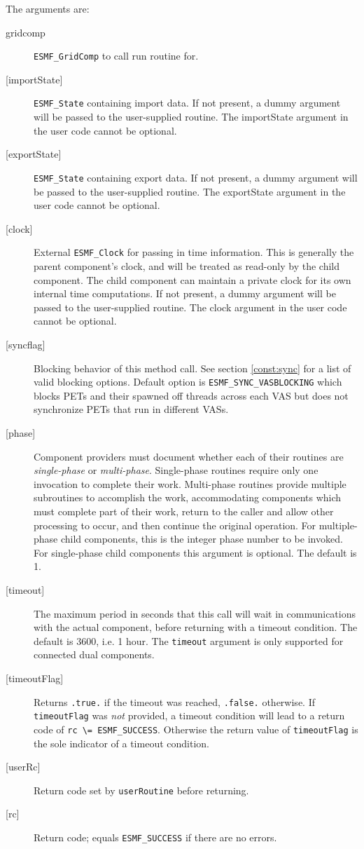    The arguments are:
   \begin{description}
   \item[gridcomp]
     {\tt ESMF\_GridComp} to call run routine for.
   \item[{[importState]}]
     {\tt ESMF\_State} containing import data. If not present, a dummy
     argument will be passed to the user-supplied routine.  The
     importState argument in the user code cannot be optional.
   \item[{[exportState]}]
     {\tt ESMF\_State} containing export data. If not present, a dummy
     argument will be passed to the user-supplied routine.  The
     exportState argument in the user code cannot be optional.
   \item[{[clock]}]
     External {\tt ESMF\_Clock} for passing in time information.
     This is generally the parent component's clock, and will be treated
     as read-only by the child component.  The child component can maintain
     a private clock for its own internal time computations. If not present, a dummy
     argument will be passed to the user-supplied routine.  The
     clock argument in the user code cannot be optional.
   \item[{[syncflag]}]
     Blocking behavior of this method call. See section \ref{const:sync}
     for a list of valid blocking options. Default option is
     {\tt ESMF\_SYNC\_VASBLOCKING} which blocks PETs and their spawned off threads
     across each VAS but does not synchronize PETs that run in different VASs.
   \item[{[phase]}]
     Component providers must document whether each of their
     routines are {\em single-phase} or {\em multi-phase}.
     Single-phase routines require only one invocation to complete
     their work.
     Multi-phase routines provide multiple subroutines to accomplish
     the work, accommodating components which must complete part of their
     work, return to the caller and allow other processing to occur,
     and then continue the original operation.
     For multiple-phase child components, this is the integer phase
     number to be invoked.
     For single-phase child components this argument is optional. The default is
     1.
   \item[{[timeout]}]
     The maximum period in seconds that this call will wait in communications
     with the actual component, before returning with a timeout condition.
     The default is 3600, i.e. 1 hour. The {\tt timeout} argument is only
     supported for connected dual components.
   \item[{[timeoutFlag]}]
     Returns {\tt .true.} if the timeout was reached, {\tt .false.} otherwise.
     If {\tt timeoutFlag} was {\em not} provided, a timeout condition will lead
     to a return code of {\tt rc \textbackslash = ESMF\_SUCCESS}. Otherwise the
     return value of {\tt timeoutFlag} is the sole indicator of a timeout
     condition.
   \item[{[userRc]}]
     Return code set by {\tt userRoutine} before returning.
   \item[{[rc]}]
     Return code; equals {\tt ESMF\_SUCCESS} if there are no errors.
   \end{description}
  
\setlength{\parskip}{\oldparskip}
\setlength{\parindent}{\oldparindent}
\setlength{\baselineskip}{\oldbaselineskip}
